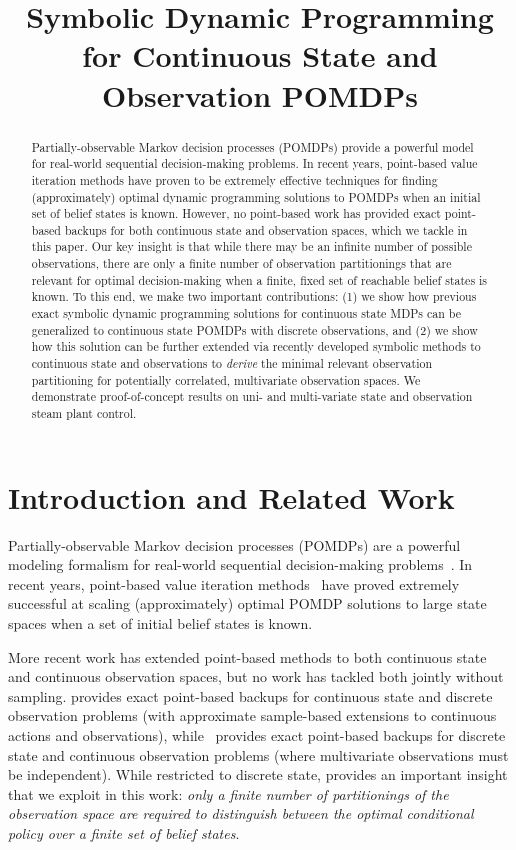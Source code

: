 \documentclass{article} %
\title{Symbolic Dynamic Programming for Continuous State and Observation POMDPs}
\author{
}
\begin{document}
\maketitle

\begin{abstract}
Partially-observable Markov decision processes (POMDPs) provide a
powerful model for real-world sequential decision-making problems.  In
recent years, point-based value iteration methods have proven to be
extremely effective techniques for finding (approximately) optimal
dynamic programming solutions to POMDPs when an initial set of belief
states is known.  However, no point-based work has provided exact
point-based backups for both continuous state and observation spaces,
which we tackle in this paper.  Our key insight is that while there
may be an infinite number of possible observations, there are only a
finite number of observation partitionings that are relevant for
optimal decision-making when a finite, fixed set of reachable belief
states is known.  To this end, we make two important contributions:
(1) we show how previous exact symbolic dynamic programming solutions
for continuous state MDPs can be generalized to continuous state
POMDPs with discrete observations, and (2) we show how this solution
can be further extended via recently developed symbolic methods to
continuous state and observations to \emph{derive} the minimal
relevant observation partitioning for potentially correlated,
multivariate observation spaces.
We demonstrate
proof-of-concept results on uni- and multi-variate state and
observation steam plant control.
\end{abstract}

\section{Introduction and Related Work}

Partially-observable Markov decision processes (POMDPs) are a powerful
modeling formalism for real-world sequential decision-making
problems~\cite{kaebling}.  In recent years, point-based value
iteration methods~\cite{pbvi_jair06,hsvi2,Perseus} have proved
extremely successful at scaling (approximately) optimal POMDP
solutions to large state spaces when a set of initial belief states is
known.

More recent work has extended point-based methods to both continuous
state and continuous observation spaces, but no work has tackled both
jointly without sampling.  \cite{Perseus_cont} provides exact
point-based backups for continuous state and discrete observation
problems (with approximate sample-based extensions to continuous
actions and observations), while~\cite{pascal_ijcai05} provides exact
point-based backups for discrete state and continuous observation
problems (where multivariate observations must be independent).  While
restricted to discrete state, \cite{pascal_ijcai05} provides an
important insight that we exploit in this work: \emph{only a finite
number of partitionings of the observation space are required to
distinguish between the optimal conditional policy over a finite set
of belief states}.
\end{document}

